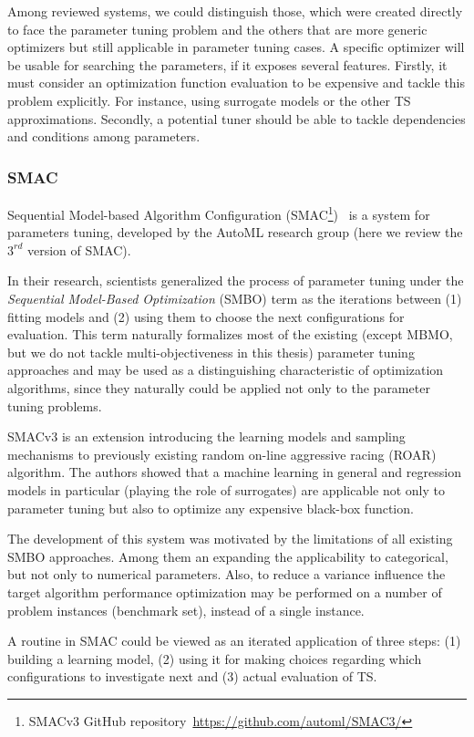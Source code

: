 Among reviewed systems, we could distinguish those, which were created directly to face the parameter tuning problem and the others that are more generic optimizers but still applicable in parameter tuning cases.
A specific optimizer will be usable for searching the parameters, if it exposes several features. Firstly, it must consider an optimization function evaluation to be expensive and tackle this problem explicitly. For instance, using surrogate models or the other TS approximations. Secondly, a potential tuner should be able to tackle dependencies and conditions among parameters.

\subsubsection{SMAC}\label{bg: smac}
Sequential Model-based Algorithm Configuration (SMAC\footnote{SMACv3 GitHub repository~\url{https://github.com/automl/SMAC3/}})~\cite{hutter2011sequential} is a system for parameters tuning, developed by the AutoML research group (here we review the $3^{rd}$ version of SMAC). 

In their research, scientists generalized the process of parameter tuning under the  \emph{Sequential Model-Based Optimization} (SMBO) term as the iterations between (1) fitting models and (2) using them to choose the next configurations for evaluation. 
This term naturally formalizes most of the existing (except MBMO, but we do not tackle multi-objectiveness in this thesis) parameter tuning approaches and may be used as a distinguishing characteristic of optimization algorithms, since they naturally could be applied not only to the parameter tuning problems.

SMACv3 is an extension introducing the learning models and sampling mechanisms to previously existing random on-line aggressive racing (ROAR) algorithm. The authors showed that a machine learning in general and regression models in particular (playing the role of surrogates) are applicable not only to parameter tuning but also to optimize any expensive black-box function. 

The development of this system was motivated by the limitations of all existing SMBO approaches. Among them an expanding the applicability to categorical, but not only to numerical parameters. Also, to reduce a variance influence the target algorithm performance optimization may be performed on a number of problem instances (benchmark set), instead of a single instance.

A routine in SMAC could be viewed as an iterated application of three steps: (1) building a learning model, (2) using it for making choices regarding which configurations to investigate next and (3) actual evaluation of TS.

